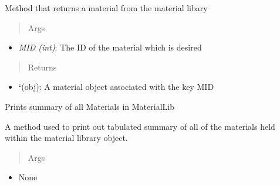 \documentclass[letterpaper,10pt,english]{sphinxmanual}
\begin{document}
\begin{fulllineitems}
\begin{fulllineitems}
\begin{itemize}
\end{itemize}

\end{fulllineitems}


\begin{fulllineitems}
\label{structures:AeroComBAT.Structures.MaterialLib.getMat}
Method that returns a material from the material libary
\begin{quote}\begin{description}
\item[{Args}] \leavevmode
\end{description}\end{quote}
\begin{itemize}
\item {} 
\emph{MID (int)}: The ID of the material which is desired

\end{itemize}
\begin{quote}\begin{description}
\item[{Returns}] \leavevmode
\end{description}\end{quote}
\begin{itemize}
\item {} 
{\color{red}\bfseries{}{}`}(obj): A material object associated with the key MID

\end{itemize}

\end{fulllineitems}


\begin{fulllineitems}
\label{structures:AeroComBAT.Structures.MaterialLib.printSummary}
Prints summary of all Materials in MaterialLib

A method used to print out tabulated summary of all of the materials
held within the material library object.
\begin{quote}\begin{description}
\item[{Args}] \leavevmode
\end{description}\end{quote}
\begin{itemize}
\item {} 
None


\end{itemize}
\end{fulllineitems}
\end{fulllineitems}
\end{document}
